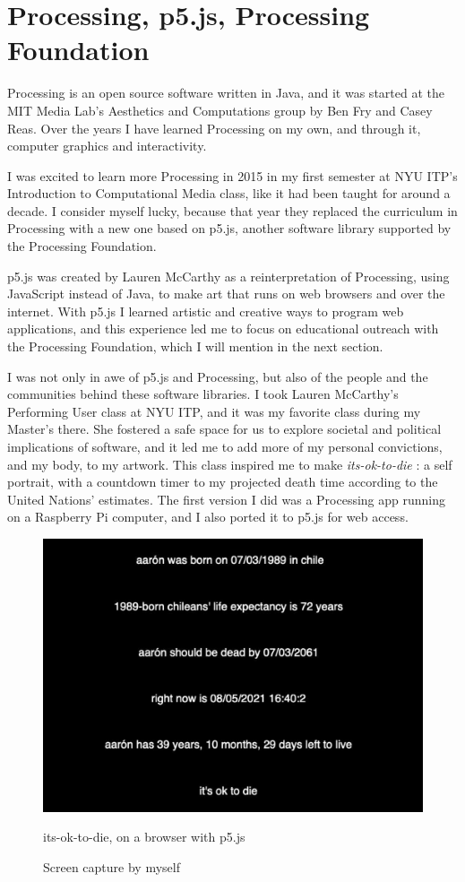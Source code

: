\section{Processing, p5.js, Processing Foundation}

Processing \cite{website-processing} is an open source software written in Java, and it was started at the MIT Media Lab's Aesthetics and Computations group by Ben Fry and Casey Reas. Over the years I have learned Processing on my own, and through it, computer graphics and interactivity.

I was excited to learn more Processing in 2015 in my first semester at \acrshort{NYU} \acrshort{ITP}'s Introduction to Computational Media class, like it had been taught for around a decade. I consider myself lucky, because that year they replaced the curriculum in Processing with a new one based on p5.js, another software library supported by the Processing Foundation.

p5.js was created by Lauren McCarthy as a reinterpretation of Processing, using JavaScript instead of Java, to make art that runs on web browsers and over the internet. With p5.js I learned artistic and creative ways to program web applications, and this experience led me to focus on educational outreach with the Processing Foundation, which I will mention in the next section.

I was not only in awe of p5.js and Processing, but also of the people and the communities behind these software libraries. I took Lauren McCarthy's Performing User class \cite{website-nyu-itp-lauren-mccarthy-performing-user} at \acrshort{NYU} \acrshort{ITP}, and it was my favorite class during my Master's there. She fostered a safe space for us to explore societal and political implications of software, and it led me to add more of my personal convictions, and my body, to my artwork. This class inspired me to make \emph{its-ok-to-die} \cite{its-ok-to-die}: a self portrait, with a countdown timer to my projected death time according to the United Nations' estimates. The first version I did was a Processing app running on a Raspberry Pi computer, and I also ported it to p5.js for web access.

\begin{figure}[ht]
  \centering
  \includegraphics[width=0.75\linewidth,height=0.35\textheight,keepaspectratio]{images/its-ok-to-die-p5js.jpg}
  \caption{its-ok-to-die, on a browser with p5.js}
  \caption*{Screen capture by myself}
  \label{fig:its-ok-to-die-p5js}
\end{figure}

